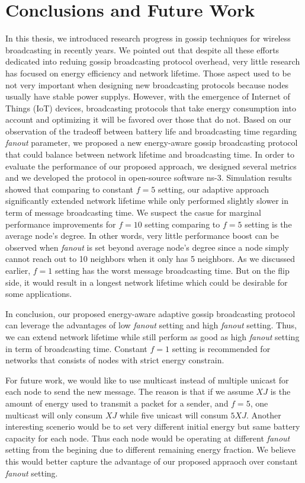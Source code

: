 \chapter{Conclusions and Future Work}
\label{Chapter6}

In this thesis, we introduced research progress in gossip techniques for wireless broadcasting in recently years. We pointed out that despite all these efforts dedicated into reduing gossip broadcasting protocol overhead, very little research has focused on energy efficiency and network lifetime. Those aspect used to be not very important when designing new broadcasting protocols because nodes usually have stable power supplys. However, with the emergence of Internet of Things (IoT) devices, broadcasting protocols that take energy consumption  into account and optimizing it will be favored over those that do not. Based on our observation of the tradeoff between battery life and broadcasting time regarding \emph{fanout} parameter, we proposed a new energy-aware gossip broadcasting protocol that could balance between network lifetime and broadcasting time. In order to evaluate the performance of our proposed approach, we designed several metrics and we developed the protocol in open-source software ns-3. Simulation results showed that comparing to constant $f=5$ setting, our adaptive approach significantly extended network lifetime while only performed slightly slower in term of message broadcasting time. We suspect the casue for marginal performance improvements for $f=10$ setting comparing to $f=5$ setting is the average node's degree. In other words, very little performance boost can be observed when \emph{fanout} is set beyond average node's degree since a node simply cannot reach out to 10 neighbors when it only has 5 neighbors. As we discussed earlier, $f=1$ setting has the worst message broadcasting time. But on the flip side, it would result in a longest network lifetime which could be desirable for some applications. 

In conclusion, our proposed energy-aware adaptive gossip broadcasting protocol can leverage the advantages of low \emph{fanout} setting and high \emph{fanout} setting. Thus, we can extend network lifetime while still perform as good as high \emph{fanout} setting in term of broadcasting time. Constant $f=1$ setting is recommended for networks that consists of nodes with strict energy constrain. 

For future work, we would like to use multicast instead of multiple unicast for each node to send the new message. The reason is that if we assume $X J$ is the amount of energy used to transmit a packet for a sender, and $f=5$, one multicast will only consum $X J$ while five unicast will consum $5X J$. Another interesting scenerio would be to set very different initial energy but same battery capacity for each node. Thus each node would be operating at different \emph{fanout} setting from the begining due to different remaining energy fraction. We believe this would better capture the advantage of our proposed appraoch over constant \emph{fanout} setting.
